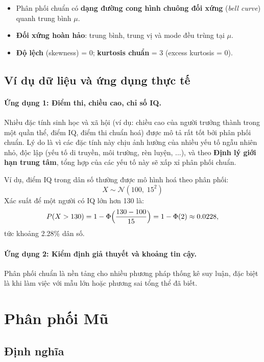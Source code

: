\begin{itemize}
    \item Phân phối chuẩn có \textbf{dạng đường cong hình chuông đối xứng} (\textit{bell curve}) quanh trung bình $\mu$.
    \item \textbf{Đối xứng hoàn hảo}: trung bình, trung vị và mode đều trùng tại $\mu$.
    \item \textbf{Độ lệch} (skewness) = 0; \textbf{kurtosis chuẩn} = 3 (excess kurtosis = 0).
\end{itemize}

\subsection*{Ví dụ dữ liệu và ứng dụng thực tế }

\paragraph{Ứng dụng 1: Điểm thi, chiều cao, chỉ số IQ.}  
Nhiều đặc tính sinh học và xã hội (ví dụ: chiều cao của người trưởng thành trong một quần thể, điểm IQ, điểm thi chuẩn hoá) được mô tả rất tốt bởi phân phối chuẩn.  
Lý do là vì các đặc tính này chịu ảnh hưởng của nhiều yếu tố ngẫu nhiên nhỏ, độc lập (yếu tố di truyền, môi trường, rèn luyện, ...), và theo \textbf{Định lý giới hạn trung tâm}, tổng hợp của các yếu tố này sẽ xấp xỉ phân phối chuẩn.

Ví dụ, điểm IQ trong dân số thường được mô hình hoá theo phân phối:
\[
X \sim \mathcal{N}(100,\;15^2)
\]
Xác suất để một người có IQ lớn hơn 130 là:
\[
P(X > 130) = 1 - \Phi\Bigl(\frac{130 - 100}{15}\Bigr) 
= 1 - \Phi(2) \approx 0.0228,
\]
tức khoảng 2.28\% dân số.

\paragraph{Ứng dụng 2: Kiểm định giả thuyết và khoảng tin cậy.}  
Phân phối chuẩn là nền tảng cho nhiều phương pháp thống kê suy luận, đặc biệt là khi làm việc với mẫu lớn hoặc phương sai tổng thể đã biết.  


\section{Phân phối Mũ}

\subsection{Định nghĩa}

